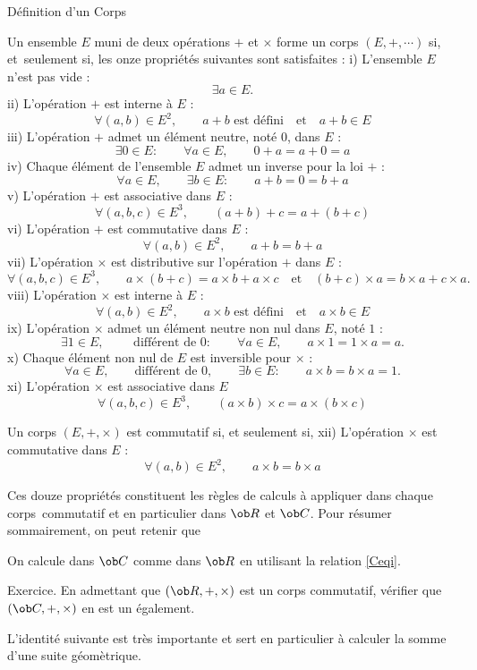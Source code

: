 \Concept [Index=Structure!Corps] Définition d'un Corps

Un ensemble $E$ muni de deux opérations $+$ et $\times$ forme un corps $(E,+,\cdots)$ si, et~seulement si, les onze propriétés suivantes sont satisfaites :
i) L'ensemble $E$ n'est pas vide : 
$$
\exists a\in E.
$$ 
ii) L'opération $+$ est interne à $E$ : 
$$
\forall (a,b)\in E^2, \qquad a+b\mbox{ est défini}\quad\mbox{et}\quad a+b\in E
$$
iii) L'opération $+$ admet un élément neutre, noté $0$, dans $E$ : 
$$
\exists 0\in E:\qquad \forall a\in E,\qquad 0+a=a+0=a
$$
iv) Chaque élément de l'ensemble $E$ admet un inverse pour la loi $+$ : 
$$
\forall a\in E, \qquad \exists b\in E:\qquad a+b=0=b+a
$$
v) L'opération $+$ est associative dans $E$ :
$$
\forall (a,b,c)\in E^3, \qquad(a+b)+c=a+(b+c)
$$ 
vi) L'opération $+$ est commutative dans $E$ : 
$$
\forall (a,b)\in E^2, \qquad a+b=b+a
$$
vii) L'opération $\times$ est distributive sur l'opération $+$ dans $E$ : 
$$
\forall(a,b,c)\in E^3, \qquad a\times(b+c)=a\times b+a\times c\quad\mbox{et}\quad (b+c)\times a=b\times a+c\times a.
$$ 
viii) L'opération $\times$ est interne à $E$ : 
$$
\forall (a,b)\in E^2,\qquad a\times b\mbox{ est défini}\quad \mbox{et}\quad a\times b\in E
$$
ix) L'opération $\times$ admet un élément neutre non nul dans $E$, noté $1$ :
$$
\exists 1\in E, \qquad\mbox{ différent de }0: \qquad \forall a\in E, \qquad a\times1=1\times a=a.
$$ 
x) Chaque élément non nul de $E$ est inversible pour $\times$ : 
$$
\forall a\in E, \qquad\mbox{différent de }0, \qquad \exists b\in E:\qquad a\times b=b\times a=1. 
$$
xi) L'opération $\times$ est associative dans $E$
$$
\forall (a,b,c)\in E^3, \qquad(a\times b)\times c=a\times(b\times c)
$$ 

\Definition 
Un corps $(E,+,\times)$ est commutatif si, et seulement si, 
\bigskip
xii) L'opération $\times$ est commutative dans $E$ : 
$$
\forall (a,b)\in E^2, \qquad a\times b=b\times a
$$

Ces douze propriétés constituent les règles de calculs à appliquer dans chaque corps~commutatif et en particulier dans $\ob R$ et $\ob C$. 
Pour résumer sommairement, on peut retenir que 
\medskip
\centerline
{
On calcule dans $\ob C$ comme dans $\ob R$ en utilisant la relation \eqref{Ceqi}.
}
\bigskip

Exercice. En admettant que $(\ob R,+,\times)$ est un corps commutatif, vérifier que $(\ob C,+,\times)$ en est un également. 
\bigskip

\goodbreak
L'identité suivante est très importante et sert en particulier à calculer la somme d'une suite géomètrique. 
\bigskip

